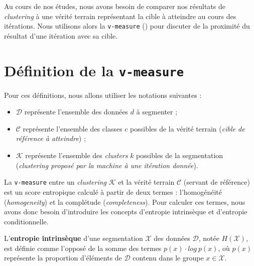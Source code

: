 \label{annex:D-ANNEXE-EVALUATION-CLUSTERING}

	Au cours de nos études, nous avons besoin de comparer nos résultats de \textit{clustering} à une vérité terrain représentant la cible à atteindre au cours des itérations.
	Nous utilisons alors la \texttt{v-measure} (\cite{rosenberg-hirschberg:2007:vmeasure-conditional-entropybased}) pour discuter de la proximité du résultat d'une itération avec sa cible.

	\section{Définition de la \texttt{v-measure}}
	\label{annex:D.1-ANNEXE-EVALUATION-CLUSTERING-DEFINITION}
		
		Pour ces définitions, nous allons utiliser les notations suivantes :
		\begin{itemize}
			\item $\mathcal{D}$ représente l'ensemble des données $d$ à segmenter ;
			\item $\mathcal{C}$ représente l'ensemble des classes $c$ possibles de la vérité terrain (\textit{cible de référence à atteindre}) ;
			\item $\mathcal{K}$ représente l'ensemble des \textit{clusters} $k$ possibles de la segmentation (\textit{clustering proposé par la machine à une itération donnée}).
		\end{itemize}
		
		
		La \texttt{v-measure} entre un \textit{clustering} $\mathcal{K}$ et la vérité terrain $\mathcal{C}$ (servant de référence) est un score entropique calculé à partir de deux termes : l'homogénéité (\textit{homogeneity}) et la complétude (\textit{completeness}).
		Pour calculer ces termes, nous avons donc besoin d'introduire les concepts d'entropie intrinsèque et d'entropie conditionnelle.
		\newline
		
		L'\textbf{entropie intrinsèque} d'une segmentation $\mathcal{X}$ des données $\mathcal{D}$, notée $H(\mathcal{X})$, est définie comme l'opposé de la somme des termes $p(x) \cdot log~p(x)$,
		où $p(x)$ représente la proportion d'éléments de $\mathcal{D}$ contenu dans le groupe $x \in \mathcal{X}$.
		
